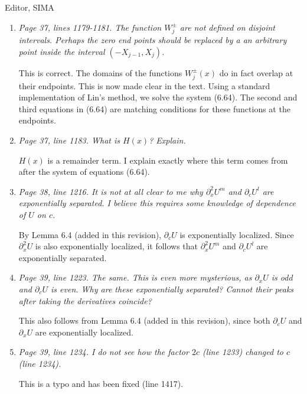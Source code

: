 \documentclass[11pt]{letter}
\begin{document}
\begin{letter}{Editor, SIMA}
\begin{enumerate}
\item \emph{Page 37, lines 1179-1181. The function $W_j^\pm$ are not defined on disjoint intervals. Perhaps the zero end points should be replaced by a an arbitrary point inside the interval $(-X_{j-1},X_j)$.}
\vspace{4mm}

This is correct. The domains of the functions $W_j^\pm(x)$ do in fact overlap at their endpoints. This is now made clear in the text. Using a standard implementation of Lin's method, we solve the system (6.64). The second and third equations in (6.64) are matching conditions for these functions at the endpoints.

\item \emph{Page 37, line 1183. What is $H(x)$? Explain.}
\vspace{4mm}

$H(x)$ is a remainder term. I explain exactly where this term comes from after the system of equations (6.64).

\item \emph{Page 38, line 1216. It is not at all clear to me why $\partial_x^2 U^m$ and $\partial_c U^l$ are exponentially separated. I believe this requires some knowledge of dependence of $U$ on $c$.}
\vspace{4mm}

By Lemma 6.4 (added in this revision), $\partial_c U$ is exponentially localized. Since $\partial_x^2 U$ is also exponentially localized, it follows that $\partial_x^2 U^m$ and $\partial_c U^l$ are exponentially separated.

\item \emph{Page 39, line 1223. The same. This is even more mysterious, as $\partial_x U$ is odd and $\partial_c U$ is even. Why are these exponentially separated? Cannot their peaks after taking the derivatives coincide?}
\vspace{4mm}

This also follows from Lemma 6.4 (added in this revision), since both $\partial_c U$ and $\partial_x U$ are exponentially localized.

\item \emph{Page 39, line 1234. I do not see how the factor $2c$ (line 1233) changed to $c$ (line 1234).}
\vspace{4mm}

This is a typo and has been fixed (line 1417).

\end{enumerate}


\end{letter}
\end{document}
